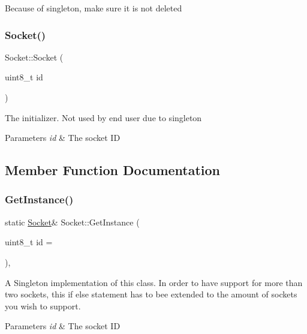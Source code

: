 Because of singleton, make sure it is not deleted \hypertarget{class_socket_a19d60fe2466026642fcb0ccabe298dc2}{}\label{class_socket_a19d60fe2466026642fcb0ccabe298dc2} 
\subsubsection{\texorpdfstring{Socket()}{Socket()}\hspace{0.1cm}{\footnotesize\ttfamily [2/2]}}
{\footnotesize\ttfamily Socket\+::\+Socket (\begin{DoxyParamCaption}\item[{uint8\+\_\+t}]{id }\end{DoxyParamCaption})\hspace{0.3cm}{\ttfamily [inline]}}

The initializer. Not used by end user due to singleton 
\begin{DoxyParams}{Parameters}
{\em id} & The socket ID \\
\hline
\end{DoxyParams}


\subsection{Member Function Documentation}
\hypertarget{class_socket_abd7d51c20995473a9c9bd6c4e0e5d7c0}{}\label{class_socket_abd7d51c20995473a9c9bd6c4e0e5d7c0} 
\subsubsection{\texorpdfstring{Get\+Instance()}{GetInstance()}}
{\footnotesize\ttfamily static \hyperlink{class_socket}{Socket}\& Socket\+::\+Get\+Instance (\begin{DoxyParamCaption}\item[{uint8\+\_\+t}]{id = {} }\end{DoxyParamCaption})\hspace{0.3cm}{\ttfamily [inline]}, {\ttfamily [static]}}

A Singleton implementation of this class. In order to have support for more than two sockets, this if else statement has to bee extended to the amount of sockets you wish to support. 
\begin{DoxyParams}{Parameters}
{\em id} & The socket ID \\
\hline
\end{DoxyParams}
\hypertarget{class_socket_a2ed22a72d5b79a2b82cff935cd508e01}{}\label{class_socket_a2ed22a72d5b79a2b82cff935cd508e01} 
